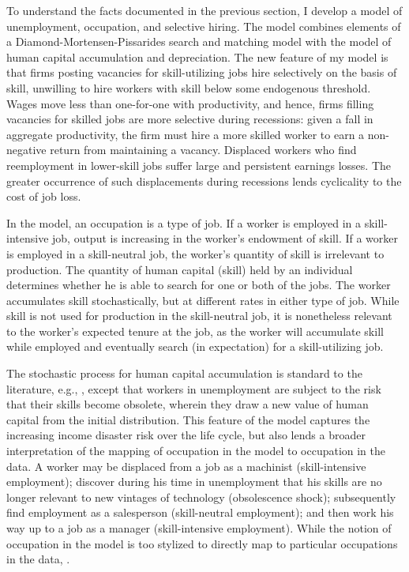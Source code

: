 \documentclass[12pt]{article}
\newcommand{\highlightP}[1]{{\emph{\color{MyPink}{#1}}}}
\newcommand{\highlightO}[1]{{\emph{\color{MyOrange}{#1}}}}
\theoremstyle{definition}
\begin{document}
To understand the facts documented in the previous section, I develop a model of unemployment, occupation, and selective hiring. The model combines elements of a Diamond-Mortensen-Pissarides search and matching model with the \citet{ljungqvistEuropeanUnemploymentDilemma1998} model of human capital accumulation and depreciation. The new feature of my model is that firms posting vacancies for skill-utilizing jobs hire selectively on the basis of skill, unwilling to hire workers with skill below some endogenous threshold. Wages move less than one-for-one with productivity, and hence, firms filling vacancies for skilled jobs are more selective during recessions: given a fall in aggregate productivity, the firm must hire a more skilled worker to earn a non-negative return from maintaining a vacancy. Displaced workers who find reemployment in lower-skill jobs suffer large and persistent earnings losses. The greater occurrence of such displacements during recessions lends cyclicality to the cost of job loss. 

In the model, an occupation is a type of job. \highlightO{I consider two types of jobs: skill-intensive and skill-neutral.} If a worker is employed in a skill-intensive job, output is increasing in the worker's endowment of skill. If a worker is employed in a skill-neutral job, the worker's quantity of skill is irrelevant to production. The quantity of human capital (skill) held by an individual determines whether he is able to search for one or both of the jobs. The worker accumulates skill stochastically, but at different rates in either type of job. While skill is not used for production in the skill-neutral job, it is nonetheless relevant to the worker's expected tenure at the job, as the worker will accumulate skill while employed and eventually search (in expectation) for a skill-utilizing job. 

The stochastic process for human capital accumulation is standard to the literature, e.g., \citet{ljungqvistEuropeanUnemploymentDilemma1998}, except that workers in unemployment are subject to the risk that their skills become obsolete, wherein they draw a new value of human capital from the initial distribution. This feature of the model captures the increasing income disaster risk over the life cycle, but also lends a broader interpretation of the mapping of occupation in the model to occupation in the data. A worker may be displaced from a job as  a machinist (skill-intensive employment); discover during his time in unemployment  that his skills are no longer relevant to new vintages of technology (obsolescence  shock); subsequently find employment as a salesperson (skill-neutral employment);  and then work his way up to a job as a manager (skill-intensive employment). While the notion of occupation in the model is too stylized to directly map to particular occupations in the data, \highlightP{it is general enough to capture such patterns of mobility within and across occupation hierarchies}. 
\end{document}
